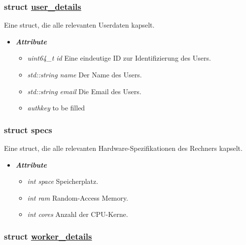 \documentclass[a4paper,12pt]{article}
\newcommand\purl[1]{\protect\url{#1}}
\begin{document}
\subsubsection{struct \purl{user_details}}

Eine struct, die alle relevanten Userdaten kapselt.

\begin{itemize}[label={}]

	\item \textit{\textbf{Attribute}}
		\begin{itemize}[label={\textbullet}]
			\item \textit{uint64\_t id} Eine eindeutige ID zur Identifizierung des Users.
			
			\item \textit{std::string name} Der Name des Users.
			
			\item \textit{std::string email} Die Email des Users.
			
			\item \textit{authkey} to be filled
		\end{itemize}


\end{itemize}

\subsubsection{struct specs}

Eine struct, die alle relevanten Hardware-Spezifikationen des Rechners kapselt.


\begin{itemize}[label={}]

	\item \textit{\textbf{Attribute}}
		\begin{itemize}[label={\textbullet}]
			\item \textit{int space} Speicherplatz.
			
			\item \textit{int ram} Random-Access Memory.
			
			\item \textit{int cores} Anzahl der CPU-Kerne.
			
		\end{itemize}


\end{itemize}

\subsubsection{struct \purl{worker_details}}
\end{document}
